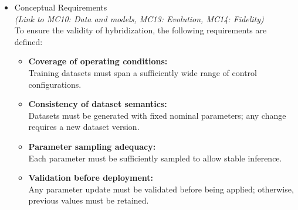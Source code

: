 \documentclass[
]{article}
\providecommand{\tightlist}{%
  \setlength{\itemsep}{0pt}\setlength{\parskip}{0pt}}
\begin{document}
\begin{itemize}
\begin{itemize}
\begin{itemize}
\begin{itemize}
        \begin{itemize}
        \tightlist
        \item
          \textbf{Parameter identification capability:}\\
          Determine which model parameters must be updated to explain
          discrepancies.
        \item
          \textbf{Parameter estimation capability:}\\
          Infer corrected values or correction laws for the identified
          parameters.
        \item
          \textbf{Adaptive simulation capability:}\\
          Enable the simulation model to \textbf{continuously reflect
          the behavior of the physical system} without direct
          recalibration.
        \end{itemize}

        These capabilities enhance the DT by enabling \textbf{adaptive
        and self-consistent behavior}, directly improving service
        reliability (MC6) and model interaction within the DT
        constellation (MC12).
      \item
        Conceptual Requirements\\
        \emph{(Link to MC10: Data and models, MC13: Evolution, MC14:
        Fidelity)}\\
        To ensure the validity of hybridization, the following
        requirements are defined:

        \begin{itemize}
        \tightlist
        \item
          \textbf{Coverage of operating conditions:}\\
          Training datasets must span a sufficiently wide range of
          control configurations.
        \item
          \textbf{Consistency of dataset semantics:}\\
          Datasets must be generated with fixed nominal parameters; any
          change requires a new dataset version.
        \item
          \textbf{Parameter sampling adequacy:}\\
          Each parameter must be sufficiently sampled to allow stable
          inference.
        \item
          \textbf{Validation before deployment:}\\
          Any parameter update must be validated before being applied;
          otherwise, previous values must be retained.
        \end{itemize}


\end{itemize}
\end{itemize}
\end{itemize}
\end{itemize}
\end{document}
